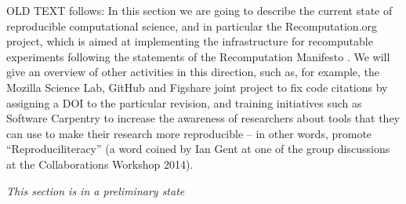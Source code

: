 OLD TEXT follows:
In this section we are going to describe the current state of reproducible computational science, and
in particular the Recomputation.org project, which is aimed at implementing
the infrastructure for recomputable experiments following the statements of the Recomputation
Manifesto \cite{gent:recomputation}. We will give an overview of other activities in this
direction, such as, for example, the Mozilla Science Lab, GitHub and Figshare joint project to fix code
citations by assigning a DOI to the particular revision, and training initiatives such as Software
Carpentry to increase the awareness of researchers about tools that they can use to make their
research more reproducible -- in other words, promote ``Reproduciliteracy'' (a word coined by 
Ian Gent at one of the group discussions at the Collaborations Workshop 2014).

\emph{This section is in a preliminary state}

\cite{johnson:evidence}
